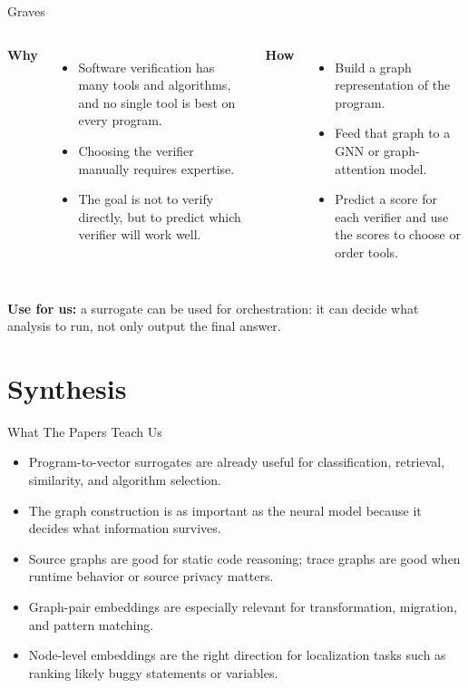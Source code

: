 \documentclass[10pt]{beamer}
\begin{document}
\begin{frame}{Graves}
  \begin{columns}[T,onlytextwidth]
    \textbf{Why}
    \begin{itemize}
      \item Software verification has many tools and algorithms, and no single tool is best on every program.
      \item Choosing the verifier manually requires expertise.
      \item The goal is not to verify directly, but to predict which verifier will work well.
    \end{itemize}

    \textbf{How}
    \begin{itemize}
      \item Build a graph representation of the program.
      \item Feed that graph to a GNN or graph-attention model.
      \item Predict a score for each verifier and use the scores to choose or order tools.
    \end{itemize}
  \end{columns}

  \vspace{0.25cm}
  \textbf{Use for us:} a surrogate can be used for orchestration: it can decide what analysis to run, not only output the final answer.
\end{frame}

\section{Synthesis}

\begin{frame}{What The Papers Teach Us}
  \begin{itemize}
    \item Program-to-vector surrogates are already useful for classification, retrieval, similarity, and algorithm selection.
    \item The graph construction is as important as the neural model because it decides what information survives.
    \item Source graphs are good for static code reasoning; trace graphs are good when runtime behavior or source privacy matters.
    \item Graph-pair embeddings are especially relevant for transformation, migration, and pattern matching.
    \item Node-level embeddings are the right direction for localization tasks such as ranking likely buggy statements or variables.
  \end{itemize}
\end{frame}
\end{document}
